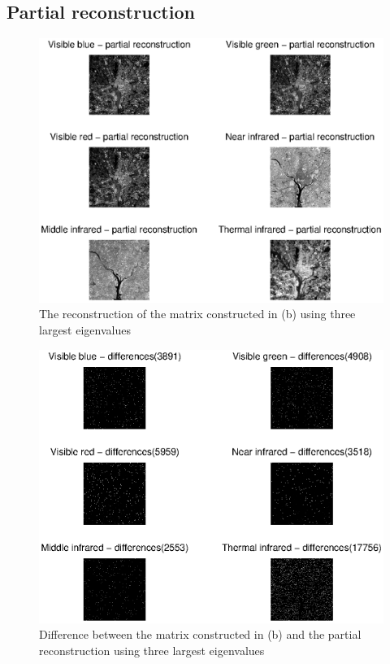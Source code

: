 \subsection{Partial reconstruction}
\begin{figure}[htb]
 \centering
 \includegraphics[width=\linewidth]{partial_recon_pca.eps}
 \caption{The reconstruction of the matrix constructed in (b) using three largest eigenvalues}
 \label{fig:partial_recon_pca}
\end{figure}
\begin{figure}[htb]
 \centering
 \includegraphics[width=\linewidth]{differences_pca.eps}
 \caption{Difference between the matrix constructed in (b) and the partial reconstruction using three largest eigenvalues}
 \label{fig:differences_pca}
\end{figure}
\clearpage
